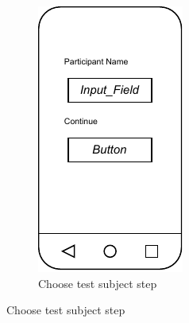 \begin{figure}[htbp]
    \centering
    \begin{subfigure}[b]{0.3\textwidth}
        \centering
        \includegraphics[width=\textwidth]{content/05_design_and_dev_artefacts/ActivityParticipantChoose.drawio.pdf}
        \caption{Choose test subject step}
        \label{subfig:chooseTestSubject}
    \end{subfigure}
    \hfill

\end{figure}
